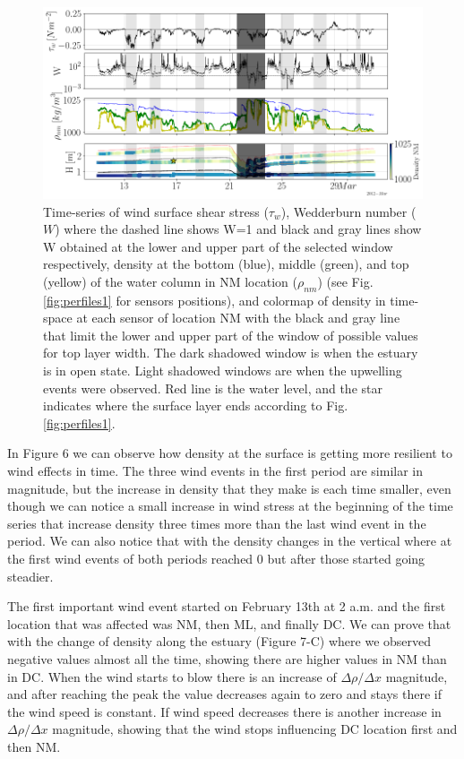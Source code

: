 \documentclass[11pt,letterpaper]{article}
\begin{document}
\begin{figure}[h!]
    \centering
    \includegraphics[width=\textwidth]{Imagenes/wedd.png}
    \caption{Time-series of wind surface shear stress ($\tau_w$), Wedderburn number ($W$) where the dashed line shows W=1 and black and gray lines show W obtained at the lower and upper part of the selected window respectively, density at the bottom (blue), middle (green), and top (yellow) of the water column in NM location ($\rho_{nm}$) (see Fig. \ref{fig:perfiles1} for sensors positions), and colormap of density in time-space at each sensor of location NM with the black and gray line that limit the lower and upper part of the window of possible values for top layer width. The dark shadowed window is when the estuary is in open state. Light shadowed windows are when the upwelling events were observed. Red line is the water level, and the star indicates where the surface layer ends according to Fig. \ref{fig:perfiles1}.}
    \label{fig:wedd}
\end{figure}


In Figure 6 we can observe how density at the surface is getting more resilient to wind effects in time. The three wind events in the first period are similar in magnitude, but the increase in density that they make is each time smaller, even though we can notice a small increase in wind stress at the beginning of the time series that increase density three times more than the last wind event in the period. We can also notice that with the density changes in the vertical where at the first wind events of both periods reached 0 but after those started going steadier.

The first important wind event started on February 13th at 2 a.m. and the first location that was affected was NM, then ML, and finally DC. We can prove that with the change of density along the estuary (Figure 7-C) where we observed negative values almost all the time, showing there are higher values in NM than in DC. When the wind starts to blow there is an increase of $\Delta \rho/\Delta x$ magnitude, and after reaching the peak the value decreases again to zero and stays there if the wind speed is constant. If wind speed decreases there is another increase in $\Delta \rho/\Delta x$ magnitude, showing that the wind stops influencing DC location first and then NM.
\end{document}
